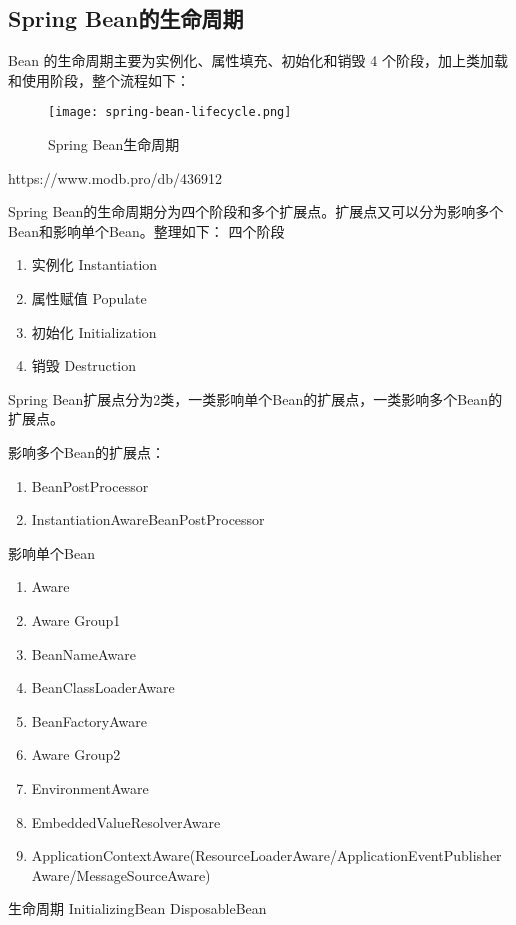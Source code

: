 \documentclass[../../../interview-questions.tex]{subfiles}
\begin{document}
\subsection{Spring Bean的生命周期}


Bean 的生命周期主要为实例化、属性填充、初始化和销毁 4 个阶段，加上类加载和使用阶段，整个流程如下：

\begin{figure}[htbp]
	\centering
	\texttt{[image: spring-bean-lifecycle.png]}
	\caption{Spring Bean生命周期}
	\label{fig:spring-bean-lifecycle}
\end{figure}

https://www.modb.pro/db/436912

Spring Bean的生命周期分为四个阶段和多个扩展点。扩展点又可以分为影响多个Bean和影响单个Bean。整理如下：
四个阶段

\begin{enumerate}
    \item {实例化 Instantiation}
    \item {属性赋值 Populate}
    \item {初始化 Initialization}
    \item {销毁 Destruction}
\end{enumerate}

Spring Bean扩展点分为2类，一类影响单个Bean的扩展点，一类影响多个Bean的扩展点。

影响多个Bean的扩展点：

\begin{enumerate}
    \item{BeanPostProcessor}
    \item {InstantiationAwareBeanPostProcessor}
\end{enumerate}

影响单个Bean

\begin{enumerate}
    \item {Aware}
    \item {Aware Group1}
    \item {BeanNameAware}
    \item {BeanClassLoaderAware}
    \item {BeanFactoryAware}
    \item {Aware Group2}
    \item {EnvironmentAware}
    \item {EmbeddedValueResolverAware}
    \item {ApplicationContextAware(ResourceLoaderAware/ApplicationEventPublisherAware/MessageSourceAware)}
\end{enumerate}

生命周期
InitializingBean
DisposableBean
\end{document}

